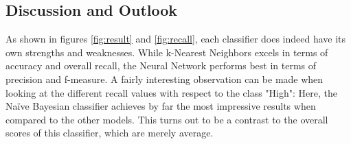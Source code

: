 

\subsection{Discussion and Outlook}

As shown in figures \ref{fig:result} and \ref{fig:recall}, each
classifier does indeed have its own strengths and weaknesses.
While k-Nearest Neighbors excels in terms of accuracy and overall
recall, the Neural Network performs best in terms of precision and
f-measure. A fairly interesting observation can be made when looking
at the different recall values with respect to the class "High":
Here, the Na\"ive Bayesian classifier achieves by far the most impressive
results when compared to the other models. This turns out to be a
contrast to the overall scores of this classifier, which are merely average.

